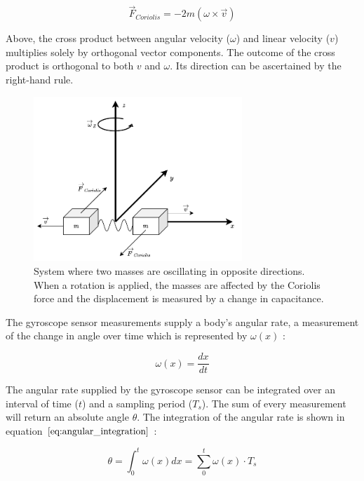 \begin{equation}
    \overrightarrow{F}_{Coriolis} = -2m(\omega \times \overrightarrow{v} )
\end{equation}

Above, the cross product between angular velocity ($\omega$) and linear velocity ($v$) multiplies solely by orthogonal vector components. The outcome of the cross product is orthogonal to both $v$ and $\omega$. Its direction can be ascertained by the right-hand rule.

\begin{figure}[!h]
    \centering
    \includegraphics[width=0.7\textwidth]{figures/coriolis.pdf}
    \caption{ System where two masses are oscillating in opposite directions. When a rotation is applied, the masses are affected by the Coriolis force and the displacement is measured by a change in capacitance. \cite{passaro2017gyroscope}}
    \label{fig:coriolis}
\end{figure}

The gyroscope sensor measurements supply a body's angular rate, a measurement of the change in angle over time which is represented by $\omega(x)$ \cite{trusov2011overview}:

\begin{equation}
    \omega(x) = \frac{dx}{dt}
\end{equation}

The angular rate supplied by the gyroscope sensor can be integrated over an interval of time ($t$) and a sampling period ($T_s$). The sum of every measurement will return an absolute angle $\theta$. The integration of the angular rate is shown in equation $\ref{eq:angular_integration}$ \cite{trusov2011overview}:

\begin{equation}
    \theta = \int_{0}^{t} \omega(x) dx = \sum_{0}^{t} \omega(x)\cdot T_s
    \label{eq:angular_integration}
\end{equation}

